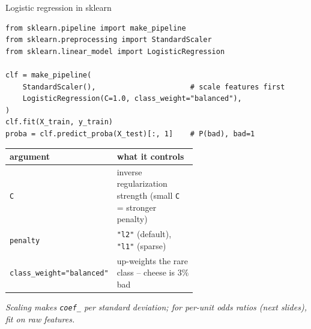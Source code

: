 \documentclass[aspectratio=169]{beamer}
\begin{document}
\begin{frame}[fragile]{Logistic regression in sklearn}
\begin{lstlisting}
from sklearn.pipeline import make_pipeline
from sklearn.preprocessing import StandardScaler
from sklearn.linear_model import LogisticRegression

clf = make_pipeline(
    StandardScaler(),                      # scale features first
    LogisticRegression(C=1.0, class_weight="balanced"),
)
clf.fit(X_train, y_train)
proba = clf.predict_proba(X_test)[:, 1]    # P(bad), bad=1
\end{lstlisting}
  \vskip 2pt
  \begin{center}\small
    \renewcommand{\arraystretch}{1.25}
    \begin{tabular}{l p{0.62\linewidth}}
      \textbf{argument} & \textbf{what it controls} \\
      \hline
      \texttt{C} & inverse regularization strength (small \texttt{C} = stronger penalty) \\
      \texttt{penalty} & \texttt{"l2"} (default), \texttt{"l1"} (sparse) \\
      \texttt{class\_weight="balanced"} & up-weights the rare class -- cheese is $3\%$ bad \\
      \hline
    \end{tabular}
  \end{center}
  \vskip 2pt
  \footnotesize \emph{Scaling makes \texttt{coef\_} per \emph{standard deviation}; for per-unit odds ratios (next slides), fit on raw features.}
\end{frame}
\end{document}
